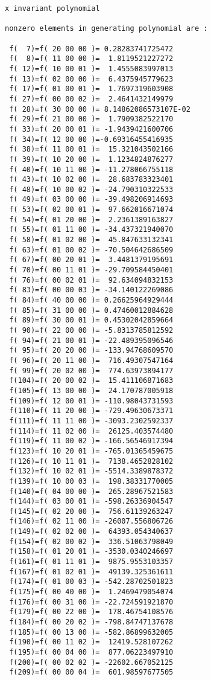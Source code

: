 \begin{footnotesize}
\begin{verbatim}
x invariant polynomial

nonzero elements in generating polynomial are :

 f(  7)=f( 20 00 00 )= 0.28283741725472
 f(  8)=f( 11 00 00 )=  1.8119521227272
 f( 12)=f( 10 00 01 )=  1.4555083997013
 f( 13)=f( 02 00 00 )=  6.4375945779623
 f( 17)=f( 01 00 01 )=  1.7697319603908
 f( 27)=f( 00 00 02 )=  2.4641432149979
 f( 28)=f( 30 00 00 )= 8.14862086573107E-02
 f( 29)=f( 21 00 00 )=  1.7909382522170
 f( 33)=f( 20 00 01 )= -1.9439421600706
 f( 34)=f( 12 00 00 )=-0.69316455416935
 f( 38)=f( 11 00 01 )=  15.321043502166
 f( 39)=f( 10 20 00 )=  1.1234824876277
 f( 40)=f( 10 11 00 )= -11.278066755118
 f( 43)=f( 10 02 00 )=  28.683783323401
 f( 48)=f( 10 00 02 )= -24.790310322533
 f( 49)=f( 03 00 00 )= -39.498206914693
 f( 53)=f( 02 00 01 )=  97.662016671074
 f( 54)=f( 01 20 00 )=  2.2361389163827
 f( 55)=f( 01 11 00 )= -34.437321940070
 f( 58)=f( 01 02 00 )=  45.847633132341
 f( 63)=f( 01 00 02 )= -70.504642686509
 f( 67)=f( 00 20 01 )=  3.4481379195691
 f( 70)=f( 00 11 01 )= -29.709584450401
 f( 76)=f( 00 02 01 )=  92.634094832153
 f( 83)=f( 00 00 03 )= -34.140122269086
 f( 84)=f( 40 00 00 )= 0.26625964929444
 f( 85)=f( 31 00 00 )= 0.47460012884628
 f( 89)=f( 30 00 01 )= 0.45302042859664
 f( 90)=f( 22 00 00 )= -5.8313785812592
 f( 94)=f( 21 00 01 )= -22.489395096546
 f( 95)=f( 20 20 00 )= -133.94768609570
 f( 96)=f( 20 11 00 )=  716.49307547164
 f( 99)=f( 20 02 00 )=  774.63973894177
 f(104)=f( 20 00 02 )=  15.411106871683
 f(105)=f( 13 00 00 )=  24.170787005918
 f(109)=f( 12 00 01 )= -110.98043731593
 f(110)=f( 11 20 00 )= -729.49630673371
 f(111)=f( 11 11 00 )= -3093.2302592337
 f(114)=f( 11 02 00 )=  26125.403574480
 f(119)=f( 11 00 02 )= -166.56546917394
 f(123)=f( 10 20 01 )= -765.01365459675
 f(126)=f( 10 11 01 )=  7138.4652828102
 f(132)=f( 10 02 01 )= -5514.3389878372
 f(139)=f( 10 00 03 )=  198.38331770005
 f(140)=f( 04 00 00 )=  265.28967521583
 f(144)=f( 03 00 01 )= -598.26336904547
 f(145)=f( 02 20 00 )=  756.61139263247
 f(146)=f( 02 11 00 )= -26007.556806726
 f(149)=f( 02 02 00 )=  64393.054340637
 f(154)=f( 02 00 02 )=  336.51063798049
 f(158)=f( 01 20 01 )= -3530.0340246697
 f(161)=f( 01 11 01 )=  9875.9553103357
 f(167)=f( 01 02 01 )=  49139.325361611
 f(174)=f( 01 00 03 )= -542.28702501823
 f(175)=f( 00 40 00 )=  1.2469479054074
 f(176)=f( 00 31 00 )= -22.724591921870
 f(179)=f( 00 22 00 )=  178.46754108576
 f(184)=f( 00 20 02 )= -798.84747137678
 f(185)=f( 00 13 00 )= -582.86899632005
 f(190)=f( 00 11 02 )=  12419.528107262
 f(195)=f( 00 04 00 )=  877.06223497910
 f(200)=f( 00 02 02 )= -22602.667052125
 f(209)=f( 00 00 04 )=  601.98597677505


\end{verbatim}
\end{footnotesize}
